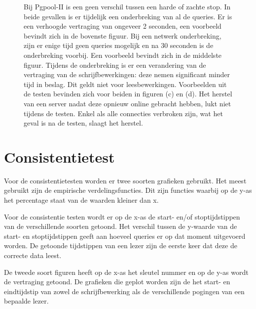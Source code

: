 \begin{figure}[ht!]
{	Bij Pgpool-II is een geen verschil tussen een harde of zachte stop. In beide gevallen is er tijdelijk een onderbreking van al de queries. Er is een verhoogde vertraging van ongeveer 2 seconden, een voorbeeld bevindt zich in de bovenste figuur. \newline
	Bij een netwerk onderbreking, zijn er enige tijd geen queries mogelijk en na 30 seconden is de onderbreking voorbij. Een voorbeeld bevindt zich in de middelste figuur.  \newline
	Tijdens de onderbreking is er een verandering van de vertraging van de schrijfbewerkingen: deze nemen significant minder tijd in beslag. Dit geldt niet voor leesbewerkingen. Voorbeelden uit de testen bevinden zich voor beiden in figuren (c) en (d). \newline
	Het herstel van een server nadat deze opnieuw online gebracht hebben, lukt niet tijdens de testen. Enkel als alle connecties verbroken zijn, wat het geval is na de testen, slaagt het herstel.  }
	\label{fig:beschikbaar-pgpool}
\end{figure}

\FloatBarrier
\section{Consistentietest}
Voor de consistentietesten worden er twee soorten grafieken gebruikt. Het meest gebruikt zijn de empirische verdelingsfuncties.  Dit zijn functies waarbij op de y-as het percentage staat van de waarden kleiner dan x.

Voor de consistentie testen wordt er op de x-as de start- en/of stoptijdstippen van de verschillende soorten getoond. Het verschil tussen de y-waarde van de start- en stoptijdstippen geeft aan hoeveel queries er op dat moment uitgevoerd worden. De getoonde tijdstippen van een lezer zijn de eerste keer dat deze de correcte data leest. 

De tweede soort figuren heeft op de x-as het sleutel nummer en op de y-as wordt de vertraging getoond. De grafieken die geplot worden zijn de het start- en eindtijdstip van zowel de schrijfbewerking als de verschillende pogingen van een bepaalde lezer. 

